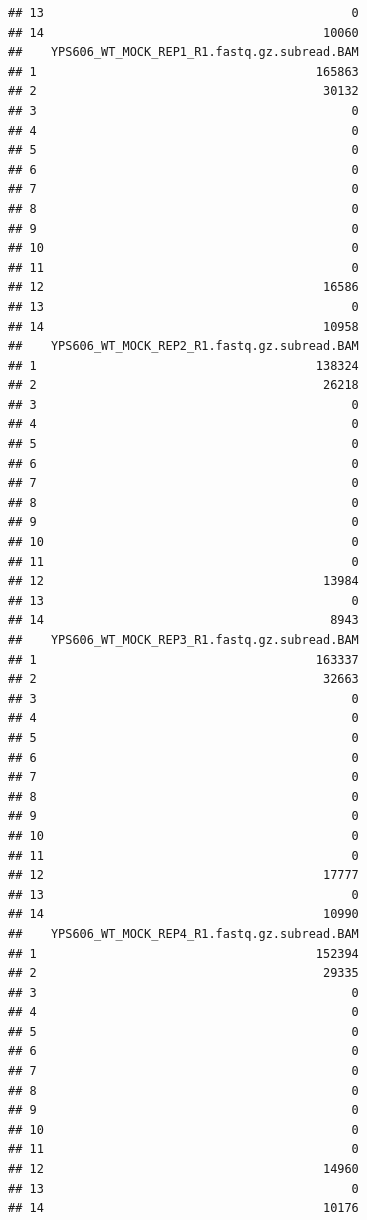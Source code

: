 \documentclass[
]{book}
\begin{document}
\begin{verbatim}
## 13                                           0
## 14                                       10060
##    YPS606_WT_MOCK_REP1_R1.fastq.gz.subread.BAM
## 1                                       165863
## 2                                        30132
## 3                                            0
## 4                                            0
## 5                                            0
## 6                                            0
## 7                                            0
## 8                                            0
## 9                                            0
## 10                                           0
## 11                                           0
## 12                                       16586
## 13                                           0
## 14                                       10958
##    YPS606_WT_MOCK_REP2_R1.fastq.gz.subread.BAM
## 1                                       138324
## 2                                        26218
## 3                                            0
## 4                                            0
## 5                                            0
## 6                                            0
## 7                                            0
## 8                                            0
## 9                                            0
## 10                                           0
## 11                                           0
## 12                                       13984
## 13                                           0
## 14                                        8943
##    YPS606_WT_MOCK_REP3_R1.fastq.gz.subread.BAM
## 1                                       163337
## 2                                        32663
## 3                                            0
## 4                                            0
## 5                                            0
## 6                                            0
## 7                                            0
## 8                                            0
## 9                                            0
## 10                                           0
## 11                                           0
## 12                                       17777
## 13                                           0
## 14                                       10990
##    YPS606_WT_MOCK_REP4_R1.fastq.gz.subread.BAM
## 1                                       152394
## 2                                        29335
## 3                                            0
## 4                                            0
## 5                                            0
## 6                                            0
## 7                                            0
## 8                                            0
## 9                                            0
## 10                                           0
## 11                                           0
## 12                                       14960
## 13                                           0
## 14                                       10176
\end{verbatim}
\end{document}
